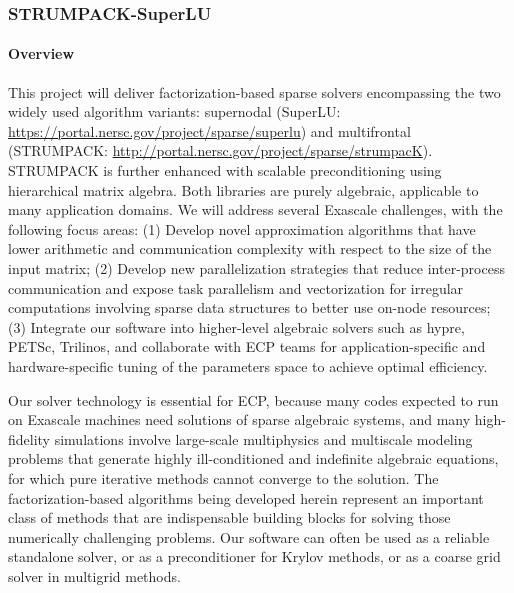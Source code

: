 \newcommand{\ignore}[1]{}
\subsubsection{ STRUMPACK-SuperLU} \label{subsubsect:strumpack}

\paragraph{Overview} 
This project will deliver factorization-based sparse solvers
encompassing the two widely used algorithm variants: supernodal
(SuperLU: \url{https://portal.nersc.gov/project/sparse/superlu})
and multifrontal (STRUMPACK: \url{http://portal.nersc.gov/project/sparse/strumpacK}).
STRUMPACK is
further enhanced with scalable preconditioning using
hierarchical matrix algebra. Both libraries are purely algebraic,
applicable to many application domains. We will address
several Exascale challenges, with the following
focus areas: 
(1) Develop novel approximation algorithms that have lower
arithmetic and communication complexity with respect to the size of the
input matrix;
(2) Develop new parallelization strategies that reduce
inter-process communication and expose task parallelism and vectorization
for irregular computations involving sparse data structures to better
use on-node resources;
(3) Integrate our software into higher-level
algebraic solvers such as hypre, PETSc, Trilinos, and collaborate with
ECP teams for application-specific and hardware-specific tuning
of the parameters space to achieve optimal efficiency.

Our solver technology is essential for ECP, because many 
codes expected to run on Exascale machines need
solutions of sparse algebraic systems, and many high-fidelity simulations
involve large-scale multiphysics and multiscale modeling problems that
generate highly ill-conditioned and indefinite algebraic equations,
for which pure iterative methods 
cannot converge to the solution.
The factorization-based algorithms being developed herein
represent an important class of methods that are indispensable building
blocks for solving those numerically challenging problems. Our software
can often be used as a reliable standalone solver, or as a preconditioner
for Krylov methods, or as a coarse grid solver in multigrid
methods. %

